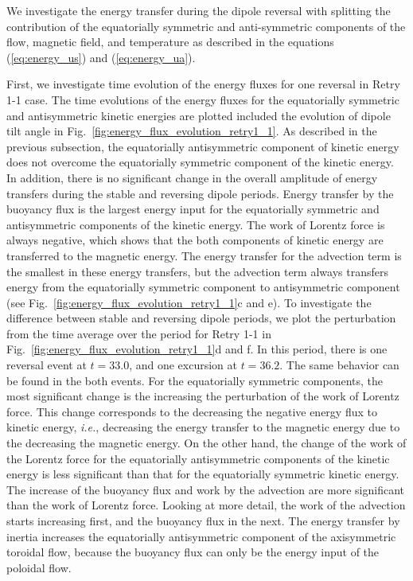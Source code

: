 We investigate the energy 
{\color{red} transfer}
during the dipole reversal with splitting the contribution of the equatorially symmetric and anti-symmetric components of the flow, magnetic field, and temperature as described in the equations (\ref{eq:energy_us}) and (\ref{eq:energy_ua}).

First, we investigate time evolution of the energy fluxes for one reversal in Retry 1-1 case. 
The time evolutions of the energy fluxes for the equatorially symmetric and antisymmetric kinetic energies are plotted included the evolution of dipole tilt angle in Fig.~\ref{fig:energy_flux_evolution_retry1_1}. 
As described in the previous subsection, the equatorially antisymmetric component of kinetic energy does not overcome the equatorially symmetric component of the kinetic energy. 
In addition, there is no significant change in the overall amplitude of energy 
{\color{red} transfers}
during the stable and reversing dipole periods. 
{\color{red} Energy transfer by}
the buoyancy flux is the largest energy input for the equatorially symmetric and antisymmetric components of the kinetic energy. 
The work of Lorentz force is always negative, %
which shows that the both components of kinetic energy are transferred to the magnetic energy. 
The energy 
{\color{red} transfer}
for the advection term is the smallest in these energy 
{\color{red} transfers,}
but the advection term always transfers energy from the equatorially symmetric component to antisymmetric component 
{\color{red}
(see Fig.~\ref{fig:energy_flux_evolution_retry1_1}c and e).
}
To investigate the difference between stable and reversing dipole periods, we plot the perturbation from the time average over the period for Retry 1-1 
{\color{red}
in Fig.~\ref{fig:energy_flux_evolution_retry1_1}d and f.
} 
In this period, there is one reversal event at $t = 33.0$, and one excursion at $t = 36.2$. 
The same behavior can be found in the both events. 
For the equatorially symmetric components, the most significant change is the increasing the perturbation of the work of Lorentz force. 
This change corresponds to the decreasing the negative energy flux to kinetic energy, {\it i.e.}, decreasing the energy transfer to the magnetic energy due to the decreasing the magnetic energy. 
On the other hand, the change of the work of the Lorentz force for the equatorially antisymmetric components of the kinetic energy is less significant than that for the equatorially symmetric kinetic energy. 
The increase of the buoyancy flux and work by the advection are more significant than the work of Lorentz force. 
Looking at more detail, the work of the advection starts increasing first, and the buoyancy flux in the next. 
The energy transfer by inertia increases the equatorially antisymmetric component of the axisymmetric toroidal flow, because the buoyancy flux can only be the energy input of the poloidal flow.

